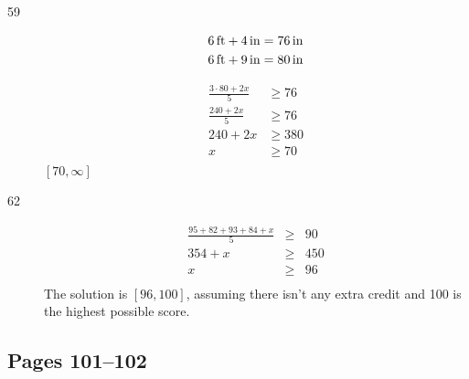 \documentclass[letterpaper, landscape]{exam}
\begin{document}
\begin{description}
        \item[59]
          \begin{align*}
            \unit[6]{ft} + \unit[4]{in} &= \unit[76]{in} \\
            \unit[6]{ft} + \unit[9]{in} &= \unit[80]{in} \\
          \end{align*}

        \begin{align*}
          \frac{3 \cdot 80 + 2x}{5} & \geq 76 \\
          \frac{240 + 2x}{5}        & \geq 76 \\
          240 + 2x                  & \geq 380 \\
          x                         & \geq 70 \\
        \end{align*}
        $\boxed{ [70, \infty] }$

        \item[62]
          \begin{align*}
            \frac{95 + 82 + 93 + 84 + x}{5} & \geq & 90 \\
            354 + x                         & \geq & 450 \\
            x                               & \geq & 96 \\
          \end{align*}
          The solution is $[96, 100]$, assuming there isn't any extra credit and 100 is the highest possible score.
          
    \end{description}

    \subsection{Pages 101--102} 
\end{document}
